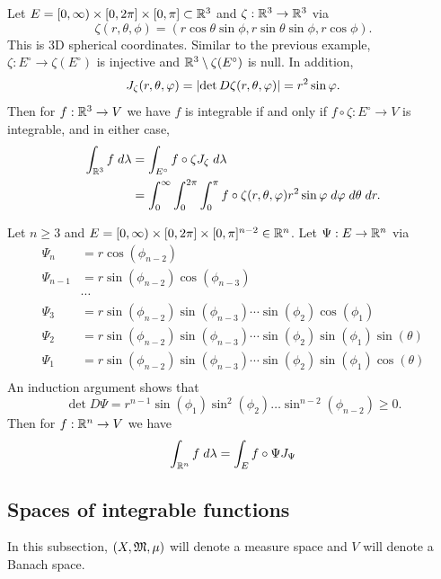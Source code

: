 \documentclass[a4paper]{article}
\begin{document}
\begin{eg}
Let $E = [0, \infty) \times [0, 2 \pi] \times [0, \pi] \subset
\mathbb{R}^3$ and $\zeta : \mathbb{R}^3 \to \mathbb{R}^3$ via
\[
\zeta(r, \theta, \phi) = (r \cos \theta \sin \phi,
r \sin \theta \sin \phi, r \cos \phi).
\]
This is 3D spherical coordinates. Similar to the previous
example, $\zeta: E^\circ \to \zeta(E^\circ)$ is injective
and $\mathbb{R}^3 \setminus \zeta(E^\circ)$ is null.
In addition,
\[
J_{\zeta}(r, \theta, \varphi) =
\left\lvert \det D \zeta (r, \theta, \varphi)\right\rvert = r^2 \sin \varphi.
\]
Then for $f : \mathbb{R}^3 \to V$ we have $f$ is integrable if and
only if $f \circ \zeta : E^\circ \to V$ is integrable,
and in either case,
\[
\begin{aligned}
\int_{\mathbb{R}^3} f \; d \lambda
&= \int_{E^\circ} f \circ \zeta J_{\zeta} \; d \lambda \\
&= \int_0^\infty \int_0^{2\pi} \int_0^\pi
f \circ \zeta(r, \theta, \varphi) r^2 \sin \varphi \; d \varphi \; d \theta
\; d r.
\end{aligned}
\]
\end{eg}

\begin{eg}
Let $n \geq 3$ and $E = [0, \infty) \times [0, 2 \pi]
\times [0, \pi]^{n-2} \in \mathbb{R}^n$. Let $\Psi: E \to \mathbb{R}^n$
via
\[
\begin{aligned}
\Psi_n &= r \cos (\phi_{n-2}) \\
\Psi_{n-1} &= r \sin (\phi_{n-2}) \cos (\phi_{n-3}) \\
&\cdots \\
\Psi_3 &= r \sin (\phi_{n-2}) \sin (\phi_{n-3}) \cdots \sin (\phi_2)
\cos (\phi_1) \\
\Psi_2 &= r \sin (\phi_{n-2}) \sin (\phi_{n-3}) \cdots \sin (\phi_2)
\sin (\phi_1) \sin (\theta) \\
\Psi_1 &= r \sin (\phi_{n-2}) \sin (\phi_{n-3}) \cdots \sin (\phi_2)
\sin (\phi_1) \cos (\theta) \\
\end{aligned}
\]
An induction argument shows that
\[
\det D\Psi = r^{n-1} \sin (\phi_1) \sin^2 (\phi_2)
\dots \sin^{n-2} (\phi_{n-2}) \geq 0.
\]
Then for $f : \mathbb{R}^n \to V$ we have
\[
\int_{\mathbb{R}^n} f \; d \lambda = \int_E f \circ \Psi J_{\Psi}
\]
\end{eg}

\subsection{Spaces of integrable functions}

In this subsection, $(X, \mathfrak{M}, \mu)$ will denote a measure
space and $V$ will denote a Banach space.
\end{document}
